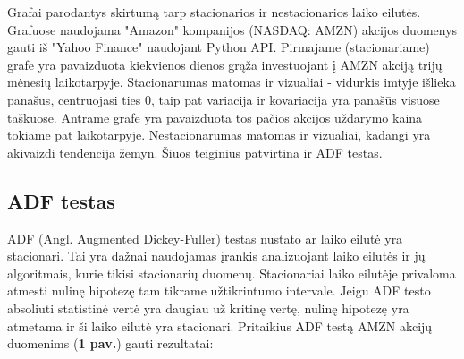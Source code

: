 \documentclass{VUMIFInfKursinis}
\begin{document}
Grafai parodantys skirtumą tarp stacionarios ir nestacionarios laiko eilutės. Grafuose naudojama "Amazon" kompanijos (NASDAQ: AMZN) akcijos duomenys gauti iš "Yahoo Finance" 
naudojant Python API\cite{yfinance}. Pirmajame (stacionariame) grafe yra pavaizduota kiekvienos dienos grąža investuojant į AMZN akciją trijų mėnesių laikotarpyje. 
Stacionarumas matomas ir vizualiai - vidurkis imtyje išlieka panašus, centruojasi ties 0, taip pat
variacija ir kovariacija yra panašūs visuose taškuose. Antrame grafe yra pavaizduota tos pačios akcijos uždarymo kaina tokiame pat laikotarpyje. 
Nestacionarumas matomas ir vizualiai, kadangi yra akivaizdi tendencija žemyn. Šiuos teiginius patvirtina ir ADF testas. %

\subsection{ADF testas}
ADF (Angl. Augmented Dickey-Fuller) testas nustato ar laiko eilutė yra stacionari. Tai yra dažnai naudojamas įrankis analizuojant laiko eilutės ir jų algoritmais, kurie tikisi stacionarių 
duomenų\cite{chi2018stock}. Stacionariai laiko eilutėje privaloma atmesti nulinę hipotezę tam tikrame užtikrintumo intervale. 
Jeigu ADF testo absoliuti statistinė vertė yra daugiau už kritinę vertę, nulinę hipotezę yra atmetama ir ši laiko eilutė yra stacionari.
Pritaikius ADF testą{\cite{seabold2010statsmodels}} AMZN akcijų duomenims (\textbf{1 pav.}) gauti rezultatai:
\end{document}
